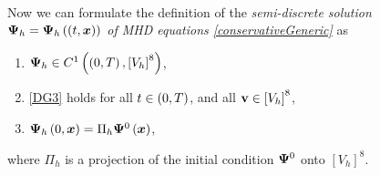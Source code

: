 \paragraph{}
Now we can formulate the definition of the \textit{semi-discrete solution ${\mathrm{\mathbf{\Psi}}_h} = {\mathrm{\mathbf{\Psi}}_h}\left((t, \mbox{\boldmath $x$}\right))$ of MHD equations \cref{conservativeGeneric}} as
\begin{enumerate}
    \label{discreteSlnDef}
    \item ${\mathrm{\mathbf{\Psi}}_h} \in C^{1}\left(\left(0, T\right), \left[V_h\right]^8\right)$,
    \item \cref{DG3} holds for all $t\in\left(0, T\right)$, and all $\mathrm{\mathbf{v}}\in \left[V_h\right]^8$,
    \item ${\mathrm{\mathbf{\Psi}}_h}\left(0, \mbox{\boldmath $x$}\right) = \Pi_h \mathrm{\mathbf{\Psi}}^0\left(\mbox{\boldmath $x$}\right)$,
\end{enumerate}
where $\Pi_h$ is a projection of the initial condition $\mathrm{\mathbf{\Psi}}^0$ onto $\left[V_h\right]^8$.


